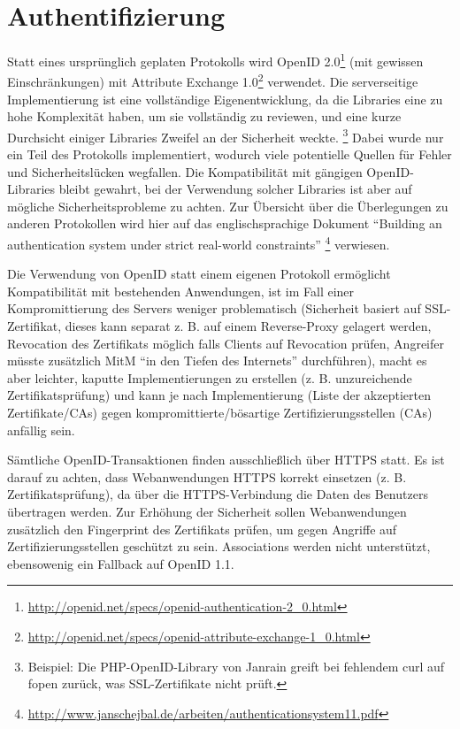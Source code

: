 \section{Authentifizierung}
Statt eines ursprünglich geplaten Protokolls wird OpenID 2.0\footnote{\url{http://openid.net/specs/openid-authentication-2_0.html}} (mit gewissen Einschränkungen)
mit Attribute Exchange 1.0\footnote{\url{http://openid.net/specs/openid-attribute-exchange-1_0.html}} verwendet.
Die serverseitige Implementierung ist eine vollständige Eigenentwicklung, da die Libraries eine zu hohe Komplexität haben, um sie vollständig zu reviewen,
und eine kurze Durchsicht einiger Libraries Zweifel an der Sicherheit weckte.
\footnote{Beispiel: Die PHP-OpenID-Library von Janrain greift bei fehlendem curl auf fopen zurück, was SSL-Zertifikate nicht prüft.}
Dabei wurde nur ein Teil des Protokolls implementiert, wodurch viele potentielle Quellen für Fehler und Sicherheitslücken wegfallen.
Die Kompatibilität mit gängigen OpenID-Libraries bleibt gewahrt, bei der Verwendung solcher Libraries ist aber auf mögliche Sicherheitsprobleme zu achten.
Zur Übersicht über die Überlegungen zu anderen Protokollen wird hier auf das englischsprachige Dokument
"`Building an authentication system under strict real-world constraints"'
\footnote{\url{http://www.janschejbal.de/arbeiten/authenticationsystem11.pdf}} verwiesen.

Die Verwendung von OpenID statt einem eigenen Protokoll ermöglicht Kompatibilität mit bestehenden Anwendungen,
ist im Fall einer Kompromittierung des Servers weniger problematisch
(Sicherheit basiert auf SSL-Zertifikat, dieses kann separat z. B. auf einem Reverse-Proxy gelagert werden,
Revocation des Zertifikats möglich falls Clients auf Revocation prüfen, Angreifer müsste zusätzlich MitM "`in den Tiefen des Internets"' durchführen), 
macht es aber leichter, kaputte Implementierungen zu erstellen (z. B. unzureichende Zertifikatsprüfung)
und kann je nach Implementierung (Liste der akzeptierten Zertifikate/CAs) gegen kompromittierte/bösartige Zertifizierungsstellen (CAs) anfällig sein.

Sämtliche OpenID-Transaktionen finden ausschließlich über HTTPS statt.
Es ist darauf zu achten, dass Webanwendungen HTTPS korrekt einsetzen (z. B. Zertifikatsprüfung), da über die HTTPS-Verbindung die Daten des Benutzers übertragen werden.
Zur Erhöhung der Sicherheit sollen Webanwendungen zusätzlich den Fingerprint des Zertifikats prüfen, um gegen Angriffe auf Zertifizierungsstellen geschützt zu sein.
Associations werden nicht unterstützt, ebensowenig ein Fallback auf OpenID 1.1.

